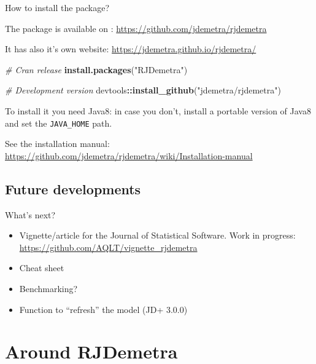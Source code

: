 \documentclass[10pt,xcolor=table,color={dvipsnames,usenames},ignorenonframetext,usepdftitle=false,french]{beamer}
\newenvironment{Shaded}{\begin{snugshade}}{\end{snugshade}}
\newcommand{\CommentTok}[1]{\textcolor[rgb]{0.56,0.35,0.01}{\textit{#1}}}
\newcommand{\KeywordTok}[1]{\textcolor[rgb]{0.13,0.29,0.53}{\textbf{#1}}}
\newcommand{\NormalTok}[1]{#1}
\newcommand{\OperatorTok}[1]{\textcolor[rgb]{0.81,0.36,0.00}{\textbf{#1}}}
\newcommand{\StringTok}[1]{\textcolor[rgb]{0.31,0.60,0.02}{#1}}
\begin{document}
\begin{frame}[fragile]{How to install the package?}
\protect\hypertarget{how-to-install-the-package-1}{}

The package is available on \large\faGithub\normalsize:
\url{https://github.com/jdemetra/rjdemetra}

It has also it's own website:
\url{https://jdemetra.github.io/rjdemetra/}

\begin{Shaded}
\begin{Highlighting}[]
\CommentTok{# Cran release}
\KeywordTok{install.packages}\NormalTok{(}\StringTok{"RJDemetra"}\NormalTok{)}

\CommentTok{# Development version}
\NormalTok{devtools}\OperatorTok{::}\KeywordTok{install_github}\NormalTok{(}\StringTok{"jdemetra/rjdemetra"}\NormalTok{)}
\end{Highlighting}
\end{Shaded}

\bcinfo To install it you need Java8: in case you don't, install a
portable version of Java8 and set the \texttt{JAVA\_HOME} path.

See the installation manual:
\url{https://github.com/jdemetra/rjdemetra/wiki/Installation-manual}

\end{frame}

\hypertarget{future-developments}{%
\subsection{Future developments}\label{future-developments}}

\begin{frame}{What's next? \bcpanchant}
\protect\hypertarget{whats-next}{}

\begin{itemize}
\item
  Vignette/article for the Journal of Statistical Software. Work in
  progress: \url{https://github.com/AQLT/vignette_rjdemetra}
\item
  Cheat sheet
\item
  Benchmarking?
\item
  Function to ``refresh'' the model (JD+ 3.0.0)
\end{itemize}

\end{frame}

\hypertarget{around-rjdemetra}{%
\section{Around RJDemetra}\label{around-rjdemetra}}
\end{document}
